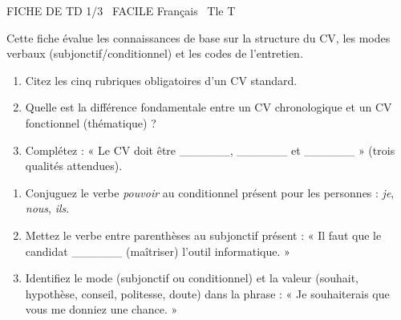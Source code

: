 \documentclass[11pt]{article}
\begin{document}
\begin{tcolorbox}[enhanced,colback=popink,colframe=popink,arc=10pt,boxrule=0pt,left=12pt,right=12pt,top=9pt,bottom=9pt]
{\color{white}\popxbold\small FICHE DE TD 1/3 \textbullet\ FACILE \hfill Français \textbullet\ Tle T\par}
\end{tcolorbox}
\vspace{4pt}
Cette fiche évalue les connaissances de base sur la structure du CV, les modes verbaux (subjonctif/conditionnel) et les codes de l'entretien.

\begin{exercice}
\begin{enumerate}
    \item Citez les cinq rubriques obligatoires d'un CV standard.
    \item Quelle est la différence fondamentale entre un CV chronologique et un CV fonctionnel (thématique) ?
    \item Complétez : « Le CV doit être \_\_\_\_\_\_, \_\_\_\_\_\_ et \_\_\_\_\_\_ » (trois qualités attendues).
\end{enumerate}
\end{exercice}

\begin{exercice}
\begin{enumerate}
    \item Conjuguez le verbe \textit{pouvoir} au conditionnel présent pour les personnes : \textit{je}, \textit{nous}, \textit{ils}.
    \item Mettez le verbe entre parenthèses au subjonctif présent : « Il faut que le candidat \_\_\_\_\_\_ (maîtriser) l'outil informatique. »
    \item Identifiez le mode (subjonctif ou conditionnel) et la valeur (souhait, hypothèse, conseil, politesse, doute) dans la phrase : « Je souhaiterais que vous me donniez une chance. »
\end{enumerate}
\end{exercice}
\end{document}
